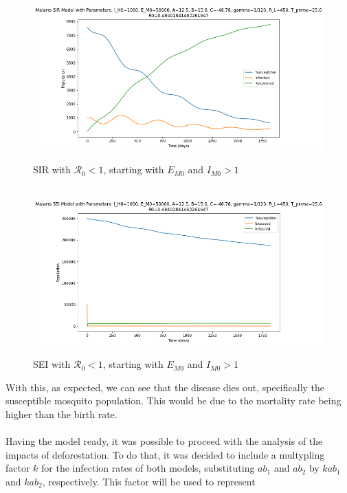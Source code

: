 \newpage
\begin{figure}[!ht]
        \centering
        \hbox{\hspace{2.5em} \includegraphics[scale=0.5] {THESIS-SIR_Initial_EI_geq_1_R0_leq_1.png}}
        \caption{SIR with $\mathcal{R}_0 <1$, starting with $E_{M0}$ and $I_{M0}>1$}
\end{figure} 
\begin{figure}[!ht]
        \centering
        \hbox{\hspace{2.5em} \includegraphics[scale=0.5] {THESIS-SEI_Initial_EI_geq_1_R0_leq_1.png}}
        \caption{SEI with $\mathcal{R}_0 <1$, starting with $E_{M0}$ and $I_{M0}>1$}
\end{figure}
With this, as expected, we can see that the disease dies out, specifically 
the susceptible mosquito population. This would be due to the mortality rate
being higher than the birth rate.
\\\\Having the model ready, it was possible to proceed with the analysis of
the impacts of deforestation. To do that, it was decided to include a multypling
factor $k$ for the infection rates of both models, substituting $ab_1$ and
$ab_2$ by $kab_1$ and $kab_2$, respectively. This factor will be used to represent 
